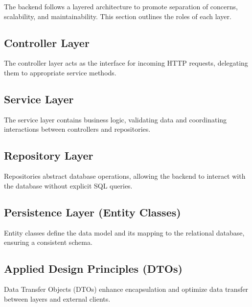 \Author{\daAuthorThree}


    The backend follows a layered architecture to promote separation of concerns, scalability, and maintainability. This section outlines the roles of each layer.

    \subsection{Controller Layer}
    The controller layer acts as the interface for incoming HTTP requests, delegating them to appropriate service methods.

    \subsection{Service Layer}
    The service layer contains business logic, validating data and coordinating interactions between controllers and repositories.

    \subsection{Repository Layer}
    Repositories abstract database operations, allowing the backend to interact with the database without explicit SQL queries.

    \subsection{Persistence Layer (Entity Classes)}
    Entity classes define the data model and its mapping to the relational database, ensuring a consistent schema.

    \subsection{Applied Design Principles (DTOs)}
    Data Transfer Objects (DTOs) enhance encapsulation and optimize data transfer between layers and external clients.

    \newpage